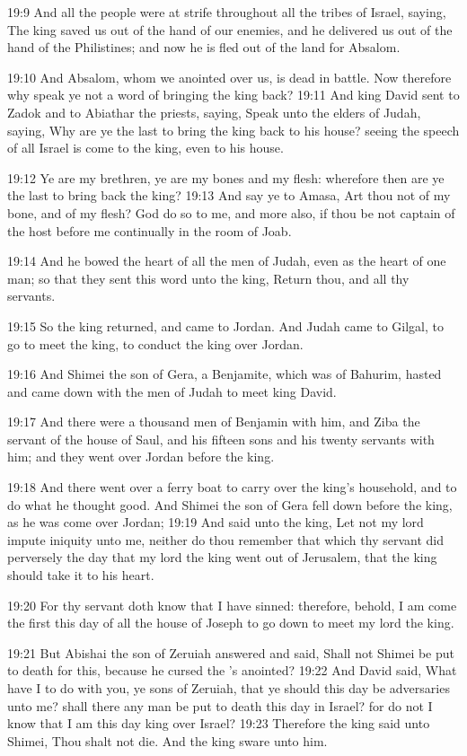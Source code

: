 19:9 And all the people were at strife throughout all the tribes of Israel, saying, The king saved us out of the hand of our enemies, and he delivered us out of the hand of the Philistines; and now he is fled out of the land for Absalom.

19:10 And Absalom, whom we anointed over us, is dead in battle. Now therefore why speak ye not a word of bringing the king back?  19:11 And king David sent to Zadok and to Abiathar the priests, saying, Speak unto the elders of Judah, saying, Why are ye the last to bring the king back to his house? seeing the speech of all Israel is come to the king, even to his house.

19:12 Ye are my brethren, ye are my bones and my flesh: wherefore then are ye the last to bring back the king?  19:13 And say ye to Amasa, Art thou not of my bone, and of my flesh? God do so to me, and more also, if thou be not captain of the host before me continually in the room of Joab.

19:14 And he bowed the heart of all the men of Judah, even as the heart of one man; so that they sent this word unto the king, Return thou, and all thy servants.

19:15 So the king returned, and came to Jordan. And Judah came to Gilgal, to go to meet the king, to conduct the king over Jordan.

19:16 And Shimei the son of Gera, a Benjamite, which was of Bahurim, hasted and came down with the men of Judah to meet king David.

19:17 And there were a thousand men of Benjamin with him, and Ziba the servant of the house of Saul, and his fifteen sons and his twenty servants with him; and they went over Jordan before the king.

19:18 And there went over a ferry boat to carry over the king's household, and to do what he thought good. And Shimei the son of Gera fell down before the king, as he was come over Jordan; 19:19 And said unto the king, Let not my lord impute iniquity unto me, neither do thou remember that which thy servant did perversely the day that my lord the king went out of Jerusalem, that the king should take it to his heart.

19:20 For thy servant doth know that I have sinned: therefore, behold, I am come the first this day of all the house of Joseph to go down to meet my lord the king.

19:21 But Abishai the son of Zeruiah answered and said, Shall not Shimei be put to death for this, because he cursed the \LORD's anointed?  19:22 And David said, What have I to do with you, ye sons of Zeruiah, that ye should this day be adversaries unto me? shall there any man be put to death this day in Israel? for do not I know that I am this day king over Israel?  19:23 Therefore the king said unto Shimei, Thou shalt not die. And the king sware unto him.

